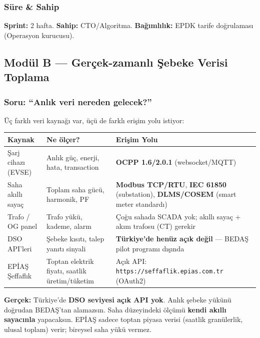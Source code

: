 \documentclass[11pt,a4paper]{article}
\begin{document}
\subsubsection{Süre \& Sahip}
\textbf{Sprint:} 2 hafta. \textbf{Sahip:} CTO/Algoritma. \textbf{Bağımlılık:} EPDK tarife doğrulaması (Operasyon kurucusu).

\subsection{Modül B — Gerçek-zamanlı Şebeke Verisi Toplama}

\subsubsection{Soru: ``Anlık veri nereden gelecek?''}

Üç farklı veri kaynağı var, üçü de farklı erişim yolu istiyor:

\begin{tabularx}{\textwidth}{l X X}
\toprule
\textbf{Kaynak} & \textbf{Ne ölçer?} & \textbf{Erişim Yolu} \\
\midrule
Şarj cihazı (EVSE) & Anlık güç, enerji, hata, transaction & \textbf{OCPP 1.6/2.0.1} (websocket/MQTT) \\
Saha akıllı sayaç & Toplam saha gücü, harmonik, PF & \textbf{Modbus TCP/RTU}, \textbf{IEC 61850} (substation), \textbf{DLMS/COSEM} (smart meter standardı) \\
Trafo / OG panel & Trafo yükü, kademe, alarm & Çoğu sahada SCADA yok; akıllı sayaç + akım trafosu (CT) gerekir \\
DSO API'leri & Şebeke kısıtı, talep yanıtı sinyali & \textbf{Türkiye'de henüz açık değil} — BEDAŞ pilot programı dışında \\
EPİAŞ Şeffaflık & Toptan elektrik fiyatı, saatlik üretim/tüketim & Açık API: \texttt{https://seffaflik.epias.com.tr} (OAuth2) \\
\bottomrule
\end{tabularx}

\begin{redbox}
\textbf{Gerçek:} Türkiye'de \textbf{DSO seviyesi açık API yok}. Anlık şebeke yükünü doğrudan BEDAŞ'tan alamazsın. Saha düzeyindeki ölçümü \textbf{kendi akıllı sayacınla} yapacaksın. EPİAŞ sadece toptan piyasa verisi (saatlik granülerlik, ulusal toplam) verir; bireysel saha yükü vermez.
\end{redbox}
\end{document}
